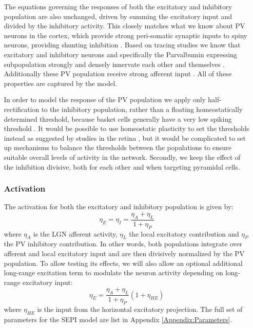 The equations governing the responses of both the excitatory and
inhibitory population are also unchanged, driven by summing the
excitatory input and divided by the inhibitory activity. This closely
matches what we know about PV neurons in the cortex, which provide
strong peri-somatic synaptic inputs to spiny neurons, providing
shunting inhibition \citep{Atallah2012, Wilson2012}. Based on tracing
studies we know that excitatory and inhibitory neurons and
specifically the Parvalbumin expressing subpopulation strongly and
densely innervate each other and themselves \citep{Buzas2001, Ma2011,
  Pfeffer2013}. Additionally these PV population receive strong
afferent input \citep{Burkhalter2008}. All of these properties are
captured by the model.

In order to model the response of the PV population we apply only
half-rectification to the inhibitory population, rather than a
floating homeostatically determined threshold, because basket cells
generally have a very low spiking threshold \citep{Ma2011}.  It would
be possible to use homeostatic plasticity to set the thresholds
instead as suggested by studies in the retina \citep{Hennig2011}, but
it would be complicated to set up mechanisms to balance the thresholds
between the populations to ensure suitable overall levels of activity
in the network. Secondly, we keep the effect of the inhibition
divisive, both for each other and when targeting pyramidal cells.

\subsubsection*{Activation}

The activation for both the excitatory and inhibitory population is
given by:
\begin{equation}
  \eta_E = \eta_I = \frac{\eta_{A} + \eta_{L}}{1 + \eta_{P}}
\end{equation}
where $\eta_{A}$ is the LGN afferent activity, $\eta_{L}$ the local
excitatory contribution and $\eta_{P}$ the PV inhibitory
contribution. In other words, both populations integrate over afferent
and local excitatory input and are then divisively normalized by the
PV population. To allow testing its effects, we will also allow an
optional additional long-range excitation term to modulate the neuron
activity depending on long-range excitatory input:
\begin{equation}
  \eta_{E} = \frac{\eta_{A} + \eta_{L}}{1 + \eta_{P}} (1+\eta_{HE})
\end{equation}
where $\eta_{HE}$ is the input from the horizontal excitatory
projection. The full set of parameters for the SEPI model are list in
Appendix \ref{Appendix:Parameters}.

